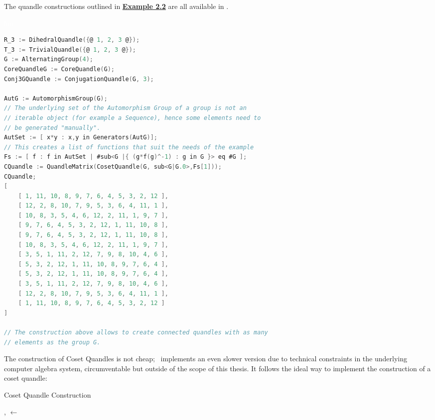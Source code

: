\documentclass{mcom-l}
\begin{document}
\noindent The quandle constructions outlined in \hyperref[quandleConst]{\textbf{Example 2.2}} are all available in \Software.
\begin{example}\textcolor{white}{line}\newline
\begin{lstlisting}[language=C]
R_3 := DihedralQuandle({@ 1, 2, 3 @});
T_3 := TrivialQuandle({@ 1, 2, 3 @});
G := AlternatingGroup(4);
CoreQuandleG := CoreQuandle(G);
Conj3GQuandle := ConjugationQuandle(G, 3);

AutG := AutomorphismGroup(G);
// The underlying set of the Automorphism Group of a group is not an 
// iterable object (for example a Sequence), hence some elements need to 
// be generated "manually".
AutSet := [ x*y : x,y in Generators(AutG)];
// This creates a list of functions that suit the needs of the example
Fs := [ f : f in AutSet | #sub<G |{ (g*f(g)^-1) : g in G }> eq #G ]; 
CQuandle := QuandleMatrix(CosetQuandle(G, sub<G|G.0>,Fs[1]));
CQuandle;
[
    [ 1, 11, 10, 8, 9, 7, 6, 4, 5, 3, 2, 12 ],
    [ 12, 2, 8, 10, 7, 9, 5, 3, 6, 4, 11, 1 ],
    [ 10, 8, 3, 5, 4, 6, 12, 2, 11, 1, 9, 7 ],
    [ 9, 7, 6, 4, 5, 3, 2, 12, 1, 11, 10, 8 ],
    [ 9, 7, 6, 4, 5, 3, 2, 12, 1, 11, 10, 8 ],
    [ 10, 8, 3, 5, 4, 6, 12, 2, 11, 1, 9, 7 ],
    [ 3, 5, 1, 11, 2, 12, 7, 9, 8, 10, 4, 6 ],
    [ 5, 3, 2, 12, 1, 11, 10, 8, 9, 7, 6, 4 ],
    [ 5, 3, 2, 12, 1, 11, 10, 8, 9, 7, 6, 4 ],
    [ 3, 5, 1, 11, 2, 12, 7, 9, 8, 10, 4, 6 ],
    [ 12, 2, 8, 10, 7, 9, 5, 3, 6, 4, 11, 1 ],
    [ 1, 11, 10, 8, 9, 7, 6, 4, 5, 3, 2, 12 ]
]

// The construction above allows to create connected quandles with as many 
// elements as the group G.
\end{lstlisting}
The construction of Coset Quandles is not cheap; \Software~implements an even slower version due to technical constraints in the underlying computer algebra system, circumventable but outside of the scope of this thesis. \newline It follows the ideal way to implement the construction of a coset quandle: \newline

\begin{algorithm}[H]
\caption{Coset Quandle Construction}\label{alg:coset}
\DontPrintSemicolon
{}
\BlankLine
\BlankLine
{}
\Set, \Map $\leftarrow$ \;


\end{algorithm}
\end{example}
\end{document}
